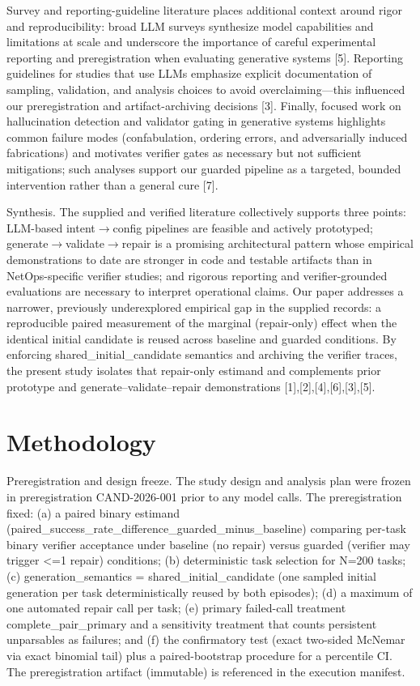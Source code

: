 \documentclass[conference]{IEEEtran}
\begin{document}
Survey and reporting-guideline literature places additional context around rigor and reproducibility: broad LLM surveys synthesize model capabilities and limitations at scale and underscore the importance of careful experimental reporting and preregistration when evaluating generative systems [5]. Reporting guidelines for studies that use LLMs emphasize explicit documentation of sampling, validation, and analysis choices to avoid overclaiming---this influenced our preregistration and artifact-archiving decisions [3]. Finally, focused work on hallucination detection and validator gating in generative systems highlights common failure modes (confabulation, ordering errors, and adversarially induced fabrications) and motivates verifier gates as necessary but not sufficient mitigations; such analyses support our guarded pipeline as a targeted, bounded intervention rather than a general cure [7].

Synthesis. The supplied and verified literature collectively supports three points: LLM-based intent\ensuremath{\rightarrow}config pipelines are feasible and actively prototyped; generate\ensuremath{\rightarrow}validate\ensuremath{\rightarrow}repair is a promising architectural pattern whose empirical demonstrations to date are stronger in code and testable artifacts than in NetOps-specific verifier studies; and rigorous reporting and verifier-grounded evaluations are necessary to interpret operational claims. Our paper addresses a narrower, previously underexplored empirical gap in the supplied records: a reproducible paired measurement of the marginal (repair-only) effect when the identical initial candidate is reused across baseline and guarded conditions. By enforcing shared\_initial\_candidate semantics and archiving the verifier traces, the present study isolates that repair-only estimand and complements prior prototype and generate--validate--repair demonstrations [1],[2],[4],[6],[3],[5].

\section{Methodology}
Preregistration and design freeze. The study design and analysis plan were frozen in preregistration CAND-2026-001 prior to any model calls. The preregistration fixed: (a) a paired binary estimand (paired\_success\_rate\_difference\_guarded\_minus\_baseline) comparing per-task binary verifier acceptance under baseline (no repair) versus guarded (verifier may trigger <=1 repair) conditions; (b) deterministic task selection for N=200 tasks; (c) generation\_semantics = shared\_initial\_candidate (one sampled initial generation per task deterministically reused by both episodes); (d) a maximum of one automated repair call per task; (e) primary failed-call treatment complete\_pair\_primary and a sensitivity treatment that counts persistent unparsables as failures; and (f) the confirmatory test (exact two-sided McNemar via exact binomial tail) plus a paired-bootstrap procedure for a percentile CI. The preregistration artifact (immutable) is referenced in the execution manifest.
\end{document}
